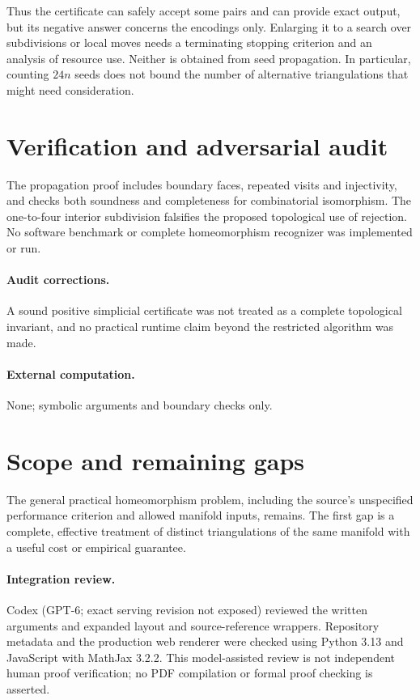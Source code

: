 \documentclass[11pt]{article}
\begin{document}
Thus the certificate can safely accept some pairs and can provide exact output,
but its negative answer concerns the encodings only. Enlarging it to a search
over subdivisions or local moves needs a terminating stopping criterion and
an analysis of resource use. Neither is obtained from seed propagation.
In particular, counting $24n$ seeds does not bound the number of alternative
triangulations that might need consideration.
\section{Verification and adversarial audit}
The propagation proof includes boundary faces, repeated visits and
injectivity, and checks both soundness and completeness for combinatorial
isomorphism. The one-to-four interior subdivision falsifies the proposed
topological use of rejection. No software benchmark or complete homeomorphism
recognizer was implemented or run.
\paragraph{Audit corrections.} A sound positive simplicial certificate was not treated as a complete topological invariant, and no practical runtime claim beyond the restricted algorithm was made.
\paragraph{External computation.} None; symbolic arguments and boundary checks only.
\section{Scope and remaining gaps}
The general practical homeomorphism problem, including the source's
unspecified performance criterion and allowed manifold inputs, remains. The
first gap is a complete, effective treatment of distinct triangulations of the
same manifold with a useful cost or empirical guarantee.
\paragraph{Integration review.} Codex (GPT-6; exact serving revision not exposed) reviewed the written arguments and expanded layout and source-reference wrappers. Repository metadata and the production web renderer were checked using Python 3.13 and JavaScript with MathJax 3.2.2. This model-assisted review is not independent human proof verification; no PDF compilation or formal proof checking is asserted.
\end{document}
